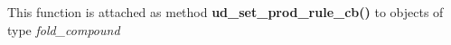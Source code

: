 \begin{DoxyRefList}
\item[\label{wrappers__wrappers000077}%
\Hypertarget{wrappers__wrappers000077}%
Global \hyperlink{group__domains__up_ga745a99f0bc72898d54de16f6e538828a}{vrna\+\_\+ud\+\_\+set\+\_\+prod\+\_\+rule\+\_\+cb} (vrna\+\_\+fold\+\_\+compound\+\_\+t $\ast$vc, vrna\+\_\+callback\+\_\+ud\+\_\+production $\ast$pre\+\_\+cb, vrna\+\_\+callback\+\_\+ud\+\_\+energy $\ast$e\+\_\+cb)]This function is attached as method {\bfseries ud\+\_\+set\+\_\+prod\+\_\+rule\+\_\+cb()} to objects of type {\itshape fold\+\_\+compound} 
\end{DoxyRefList}